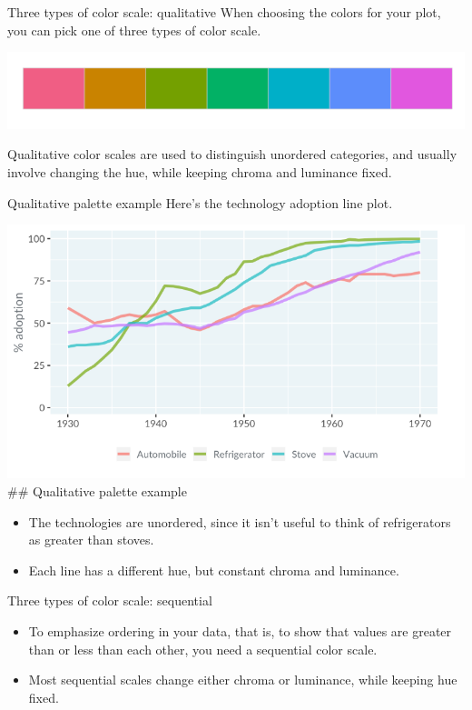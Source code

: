 \documentclass[
  ignorenonframetext,
]{beamer}
\begin{document}
\begin{frame}{Three types of color scale: qualitative}
\label{three-types-of-color-scale-qualitative}
When choosing the colors for your plot, you can pick one of three types
of color scale.

\includegraphics{../images/im81.png}

Qualitative color scales are used to distinguish unordered categories,
and usually involve changing the hue, while keeping chroma and luminance
fixed.
\end{frame}

\begin{frame}{Qualitative palette example}
\label{qualitative-palette-example}
Here's the technology adoption line plot.

\includegraphics{../images/im82.png} \#\# Qualitative palette example

\begin{itemize}
\item
  The technologies are unordered, since it isn't useful to think of
  refrigerators as greater than stoves.
\item
  Each line has a different hue, but constant chroma and luminance.
\end{itemize}
\end{frame}

\begin{frame}{Three types of color scale: sequential}
\label{three-types-of-color-scale-sequential}
\begin{itemize}
\item
  To emphasize ordering in your data, that is, to show that values are
  greater than or less than each other, you need a sequential color
  scale.
\item
  Most sequential scales change either chroma or luminance, while
  keeping hue fixed.
\end{itemize}
\end{frame}
\end{document}
